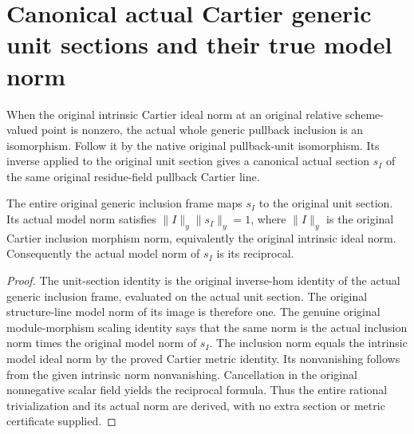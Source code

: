 \section{Canonical actual Cartier generic unit sections and their true model norm}

\begin{definition}
\label{def:actual-cartier-generic-inclusion-frame}
\leanok
{}
When the original intrinsic Cartier ideal norm at an original
relative scheme-valued point is nonzero, the actual whole generic
pullback inclusion is an isomorphism. Follow it by the native
original pullback-unit isomorphism. Its inverse applied to the
original unit section gives a canonical actual section $s_I$ of
the same original residue-field pullback Cartier line.
\end{definition}

\begin{lemma}
\label{lem:actual-cartier-generic-unit-section-model-norm}
\leanok
{}
The entire original generic inclusion frame maps $s_I$ to the
original unit section. Its actual model norm satisfies
$\|I\|_y\|s_I\|_y=1$, where $\|I\|_y$ is the original Cartier
inclusion morphism norm, equivalently the original intrinsic ideal
norm. Consequently the actual model norm of $s_I$ is its reciprocal.
\end{lemma}
\begin{proof}
The unit-section identity is the original inverse-hom identity of
the actual generic inclusion frame, evaluated on the actual unit
section. The original structure-line model norm of its image is
therefore one. The genuine original module-morphism scaling
identity says that the same norm is the actual inclusion norm
times the original model norm of $s_I$. The inclusion norm equals
the intrinsic model ideal norm by the proved Cartier metric
identity. Its nonvanishing follows from the given intrinsic norm
nonvanishing. Cancellation in the original nonnegative scalar
field yields the reciprocal formula. Thus the entire rational
trivialization and its actual norm are derived, with no extra
section or metric certificate supplied.
\end{proof}
